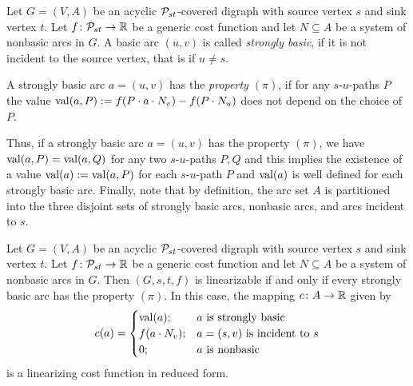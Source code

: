\begin{definition}\label{stronglybasic:def}
    Let $G = (V, A)$ be an acyclic $\mathcal{P}_{st}$-covered digraph with source vertex $s$ and sink vertex $t$.  Let $f \colon  \mathcal{P}_{st} \rightarrow \mathbb{R}$ be a generic cost function and let $N \subseteq A$ be a system of nonbasic arcs in $G$. A basic arc $(u, v)$ is called \emph{strongly basic}, if it is not incident to the source vertex, that is if $u \neq s$.
    
  \noindent  A strongly basic arc $a = (u,v)$ has the \emph{property $(\pi)$}, if for 
    any $s$-$u$-paths $P$ the value $ \operatorname{val}(a, P) :=  f(P \cdot a \cdot N_v) - f(P \cdot N_u)$ does not depend  on the choice of $P$. 
    \end{definition}
    
    Thus, if a strongly basic arc $a = (u,v)$ has the property $(\pi)$,   we have  $\operatorname{val}(a, P) = \operatorname{val}(a, Q)$ for any two  $s$-$u$-paths $P, Q$ and this implies the existence of a value   $\operatorname{val}(a) := \operatorname{val}(a, P)$ for each  $s$-$u$-path $P$ and $\operatorname{val}(a)$ is well defined for each strongly basic arc. Finally, note that by definition, the arc set $A$ is partitioned into the three disjoint sets of strongly basic arcs, nonbasic arcs, and arcs incident to $s$. 


\begin{lemma}
\label{lemma:property-pi}
    Let $G = (V, A)$ be an acyclic $\mathcal{P}_{st}$-covered digraph with source vertex $s$ and sink vertex $t$. Let $f \colon \mathcal{P}_{st} \rightarrow \mathbb{R}$ be a generic cost function and let $N \subseteq A$ be a system of nonbasic arcs in $G$. Then $(G, s,t,f)$ is linearizable if and only if every strongly basic arc has the property $(\pi)$. In this case, the mapping   $c \colon  A \rightarrow \mathbb{R}$ given by
    \[
    c(a) = \begin{cases}
    \operatorname{val}(a); & a \text{ is strongly basic }\\
    f(a \cdot N_v); & a = (s,v) \text{ is incident to }s\\
    0; & a \text{ is nonbasic}
    \end{cases}
    \]
    is a  linearizing cost function  in reduced form.
\end{lemma}


